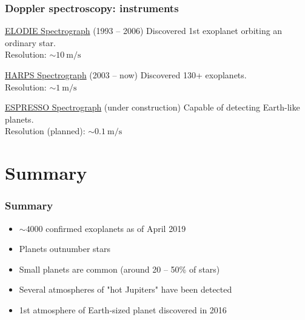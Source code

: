 \documentclass[aspectratio=169]{beamer}
\begin{document}
\begin{frame}
\begin{columns}
\end{columns}
\end{frame}

\begin{frame}
\frametitle{Doppler spectroscopy: instruments}
\begin{block}{\href{http://www.obs-hp.fr/guide/elodie/elodie-eng.html}{ELODIE Spectrograph} (1993 -- 2006)}
Discovered 1st exoplanet orbiting an ordinary star. \\
Resolution: $\sim 10 \: \mathrm{m/s}$
\end{block}
\begin{block}{\href{https://www.eso.org/sci/facilities/lasilla/instruments/harps.html}{%
HARPS Spectrograph} (2003 -- now)}
Discovered 130+ exoplanets. \\
Resolution: $\sim 1 \: \mathrm{m/s}$
\end{block}
\begin{block}{\href{https://www.eso.org/sci/facilities/paranal/instruments/espresso.html}{%
ESPRESSO Spectrograph} (under construction)}
Capable of detecting Earth-like planets. \\
Resolution (planned): $\sim 0.1 \: \mathrm{m/s}$
\end{block}
\end{frame}

\section{Summary}
\begin{frame}
\frametitle{Summary}
\begin{itemize}
\item $\sim 4000$ confirmed exoplanets as of April 2019
\item Planets outnumber stars
\item Small planets are common (around 20 -- 50\% of stars)
\item Several atmospheres of "hot Jupiters" have been detected
\item 1st atmosphere of Earth-sized planet discovered in 2016 \cite{arXiv:1612.02425}
\end{itemize}
\end{frame}
\end{document}
